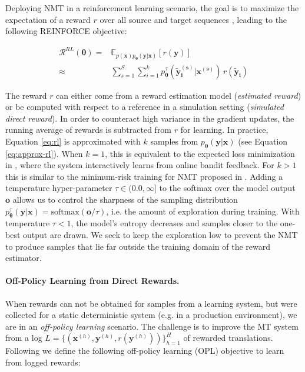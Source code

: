 Deploying NMT in a reinforcement learning scenario, the goal is to maximize the expectation of a reward $r$ over all source and target sequences \cite{WuETAL:16}, leading to the following REINFORCE \cite{Williams:92} objective:

\begin{align} 
\mathcal{R}^{RL}(\boldsymbol \theta) =& \mathbb{E}_{p(\mathbf{x}) p_{\boldsymbol \theta}(\mathbf{y}|\mathbf{x})} \left[r(\mathbf{y})\right] \label{eq:rl}\\ 
\approx& \sum_{s=1}^S \sum_{i=1}^{k} p^{\tau}_{\boldsymbol \theta}(\mathbf{\tilde{y}^{(s)}_i}|\mathbf{x^{(s)}})\, r(\mathbf{\tilde{y}_i}) \label{eq:approx-rl}
\end{align}

The reward $r$ can either come from a reward estimation model (\emph{estimated reward}) or be computed with respect to a reference in a simulation setting (\emph{simulated direct reward}). In order to counteract high variance in the gradient updates, the running average of rewards is subtracted from $r$ for learning. In practice, Equation \ref{eq:rl} is approximated with $k$ samples from $p_{\boldsymbol \theta}(\mathbf{y}|\mathbf{x})$ (see Equation \ref{eq:approx-rl}). When $k=1$, this is equivalent to the expected loss minimization in \citet{SokolovETAL:16, SokolovETALnips:16, KreutzerETAL:17}, where the system interactively learns from online bandit feedback. For $k>1$ this is similar to the minimum-risk training for NMT proposed in \citet{ShenETAL:16}. 
Adding a temperature hyper-parameter $\tau \in (0.0, \infty]$ to the softmax over the model output $\mathbf{o}$ allows us to control the sharpness of the sampling distribution $p^{\tau}_{\boldsymbol \theta}(\mathbf{y}|\mathbf{x}) = \text{softmax}(\mathbf{o}/\tau)$, i.e. the amount of exploration during training. With temperature $\tau<1$, the model's entropy decreases and samples closer to the one-best output are drawn. We seek to keep the exploration low to prevent the NMT to produce samples that lie far outside the training domain of the reward estimator.

\paragraph{Off-Policy Learning from Direct Rewards.} When rewards can not be obtained for samples from a learning system, but were collected for a static deterministic system (e.g. in a production environment), we are in an \emph{off-policy learning} scenario. The challenge is to improve the MT system from a log $L = \{(\mathbf{x}^{(h)}, \mathbf{y}^{(h)}, r(\mathbf{y}^{(h)}))\} ^H_{h=1}$ of rewarded translations. Following \citet{LawrenceETAL:17} we define the following off-policy learning (OPL) objective to learn from logged rewards:

